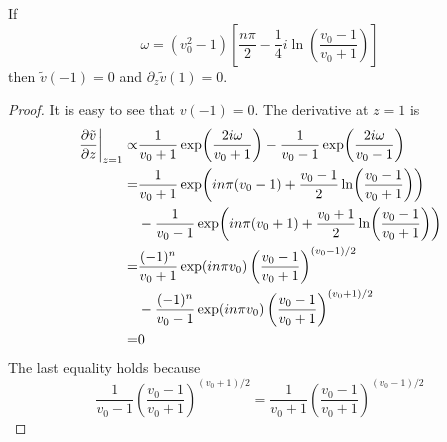 \begin{theorem}
    If
    \[\omega = (v_0^2-1) \left[ \frac{n\pi}{2} - \frac{1}{4}i\ln\left(\frac{v_0-1}{v_0+1}\right) \right]\]
    then $\tilde{v}(-1) = 0$ and $\partial_z\tilde{v}(1) = 0$.
\end{theorem}
\begin{proof}
    It is easy to see that $v(-1)=0$. The derivative at $z=1$ is
    \begin{align*}
        \eval{\pdv{\tilde{v}}{z}}_{z=1} \propto &
        \frac{1}{v_0+1}\exp(\frac{2i\omega}{v_0+1}) - \frac{1}{v_0-1}\exp(\frac{2i\omega}{v_0-1})                                   \\
        =                                       & \frac{1}{v_0+1}\exp(in\pi(v_0-1) + \frac{v_0-1}{2}\ln(\frac{v_0-1}{v_0+1}))       \\
                                                & - \frac{1}{v_0-1}\exp(in\pi(v_0+1) + \frac{v_0+1}{2}\ln(\frac{v_0-1}{v_0+1}))     \\
        =                                       & \frac{(-1)^n}{v_0+1}\exp(in\pi v_0)\left(\frac{v_0-1}{v_0+1}\right)^{(v_0-1)/2}   \\
                                                & - \frac{(-1)^n}{v_0-1}\exp(in\pi v_0)\left(\frac{v_0-1}{v_0+1}\right)^{(v_0+1)/2} \\
        =                                       & 0
    \end{align*}
    The last equality holds because
    \[ \frac{1}{v_0-1}\left(\frac{v_0-1}{v_0+1}\right)^{(v_0+1)/2}
        = \frac{1}{v_0+1}\left(\frac{v_0-1}{v_0+1}\right)^{(v_0-1)/2}  \]
\end{proof}